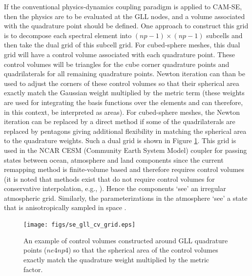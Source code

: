 \documentclass[twocol]{ametsoc}
\begin{document}
If the conventional physics-dynamics coupling paradigm is applied to CAM-SE, then the physics are to be evaluated at the GLL nodes, and a volume associated with the quadrature point should be defined. {\color{red}One approach to construct this grid is to decompose each spectral element into $(np-1) \times (np-1)$ subcells and then take the dual grid of this subcell grid.  For cubed-sphere meshes, this dual grid will have a control volume associated with each quadrature point. These control volumes will be triangles for the cube corner quadrature points and quadrilaterals for all remaining quadrature points.  Newton iteration can than be used to adjust the corners of these control volumes so that their spherical area exactly match the Gaussian weight multiplied by the metric term (these weights are used for integrating the basis functions over the elements and can therefore, in this context, be interpreted as areas).  For cubed-sphere meshes, the Newton iteration can be replaced by a direct method if some of the quadrilaterals are replaced by pentagons giving additional flexibility in matching the spherical area to the quadrature weights. Such a dual grid is shown in Figure \ref{fig:cv-grids}.{}} This grid is used in the NCAR CESM (Community Earth System Model) coupler for passing states between ocean, atmosphere and land components since the current remapping method is finite-volume based and therefore requires control volumes (it is noted that methods exist that do not require control volumes for conservative interpolation, e.g., \cite{UT2015MWR}). Hence the components `see' an irregular atmospheric grid. Similarly, the parameterizations in the atmosphere `see' a state that is anisotropically sampled in space \citep[see Figure 1 and 5 in ][]{KetAl2008JGR}.

\begin{figure}[t]
\begin{center}
\noindent\texttt{[image: figs/se\_gll\_cv\_grid.eps]}\\
\end{center}
\caption{An example of control volumes constructed around GLL quadrature points ($ne4np4$) so that the spherical area of the control volumes exactly match the quadrature weight multiplied by the metric factor.}
\label{fig:cv-grids}
\end{figure}
\end{document}
